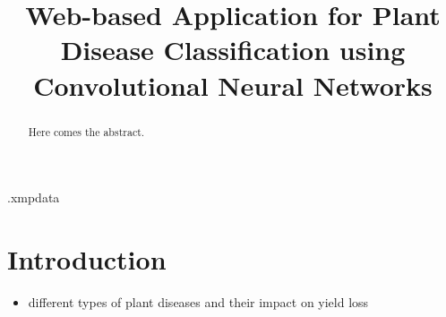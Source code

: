 \documentclass{BachelorBUI}
\title{Web-based Application for Plant Disease Classification using Convolutional Neural Networks}
\begin{document}
\begin{filecontents}[overwrite]{\jobname.xmpdata}
\makeatletter
\Title{\@title}
\Author{\@authorname}
\Language{\@thesislanguage}
\Keywords{\@keywords}
\makeatother
\end{filecontents}
%
\maketitle

\begin{abstract}

Here comes the abstract.

\end{abstract}
\tableofcontents
\section{Introduction}
\begin{itemize}
    \item different types of plant diseases and their impact on yield loss
\end{itemize}
\end{document}
